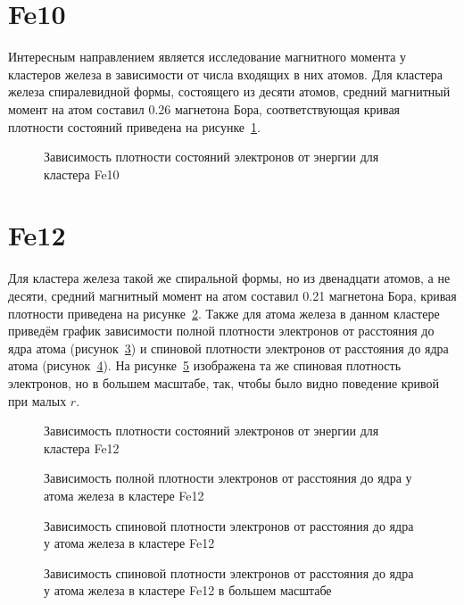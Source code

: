 \section{\textbf{Fe10}}\label{sec:results/fe10}
Интересным направлением является исследование магнитного момента у кластеров железа в зависимости от числа входящих
в них атомов. Для кластера железа спиралевидной формы, состоящего из десяти атомов, средний магнитный момент
на атом составил 0.26 магнетона Бора, соответствующая кривая плотности состояний приведена на
рисунке~\cref{fig:fe10-spectrum}.
\begin{figure}[ht]
  \caption{Зависимость плотности состояний электронов от энергии для кластера Fe10}
  \label{fig:fe10-spectrum}
\end{figure}

\section{\textbf{Fe12}}\label{sec:results/fe12}
Для кластера железа такой же спиральной формы, но из двенадцати атомов, а не десяти, средний магнитный момент на атом
составил 0.21 магнетона Бора, кривая плотности приведена на рисунке~\cref{fig:fe12-spectrum}. Также для атома железа
в данном кластере приведём график зависимости полной плотности электронов от расстояния до ядра атома
(рисунок~\cref{fig:fe12-full}) и спиновой плотности электронов от расстояния до ядра атома
(рисунок~\cref{fig:fe12-spin-3}). На рисунке~\cref{fig:fe12-spin-1} изображена та же спиновая плотность электронов,
но в большем масштабе, так, чтобы было видно поведение кривой при малых $r$.
\begin{figure}[ht]
  \caption{Зависимость плотности состояний электронов от энергии для кластера Fe12}
  \label{fig:fe12-spectrum}
\end{figure}

\begin{figure}[ht]
  \caption{Зависимость полной плотности электронов от расстояния до ядра у атома железа в кластере Fe12}
  \label{fig:fe12-full}
\end{figure}

\begin{figure}[ht]
  \caption{Зависимость спиновой плотности электронов от расстояния до ядра у атома железа в кластере Fe12}
  \label{fig:fe12-spin-3}
\end{figure}

\begin{figure}[ht]
  \caption{Зависимость спиновой плотности электронов от расстояния до ядра у атома железа в кластере Fe12 в большем масштабе}
  \label{fig:fe12-spin-1}
\end{figure}

\FloatBarrier
